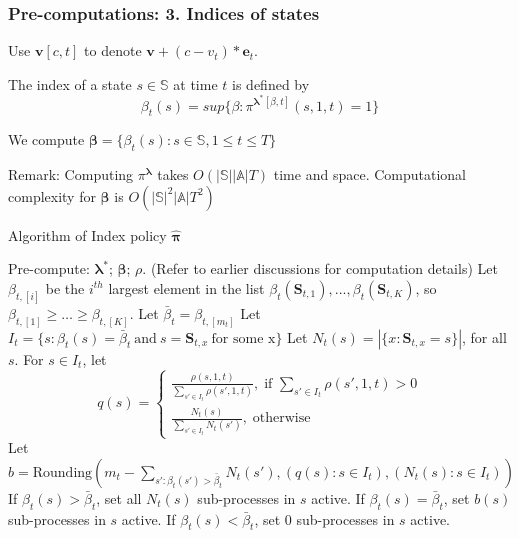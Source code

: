 \documentclass{beamer}
\newcommand{\betav}{\pmb{\beta}}
\newcommand{\lambdav}{\pmb{\lambda}}
\newcommand{\allp}{\pmb{\pi}}
\newcommand{\allstater}{\mathbf{S}}
\newcommand{\substates}{\mathbb{S}}
\newcommand{\substate}{s}
\newcommand{\subactions}{\mathbb{A}}
\begin{document}
\begin{frame}
\frametitle{Pre-computations: 3. Indices of states}
Use $\mathbf{v}[c,t]$ to denote $\mathbf{v}+(c-v_t)*\mathbf{e}_t$.

\vspace{0.5cm}
The index of a state $\substate\in\substates$ at time $t$ is defined by
\begin{equation}
\beta_t(s) = sup\{\beta: \pi^{\lambdav^*[\beta,t]}(s,1,t)=1\}
\end{equation}

\vspace{0.5cm}
We compute $\betav = \{\beta_t(s):s\in\substates,1\leq t\leq T\}$


\vspace{0.5cm}
Remark: Computing $\pi^{\lambdav}$ takes $O(|\substates||\subactions|T)$ time and space. Computational complexity for $\betav$ is $O(|\substates|^2|\subactions|T^2)$
\end{frame}

\begin{frame}{Algorithm of Index policy $\hat{\allp}$}
\begin{algorithm}[H]
\footnotesize
\begin{algorithmic}
\STATE Pre-compute: $\lambdav^*$; $\betav$; $\rho$. (Refer to earlier discussions for computation details) 
    \STATE Let $\beta_{t,[i]}$ be the $i^{th}$ largest element in the list $\beta_t(\allstater_{t,1}),...,\beta_t(\allstater_{t,K})$, so $\beta_{t,[1]}\geq\ldots\geq \beta_{t,[K]}$. 
    \STATE Let $\bar{\beta}_t = \beta_{t,[m_t]}$
    \STATE Let $I_t=\{\substate : \beta_t(s)=\bar{\beta}_t\ \text{and}\ s=\allstater_{t,x}\ \text{for some x}\}$
    \STATE Let $N_t(s) = |\{x:\allstater_{t,x}=s\}|$, for all $\substate$.
    \STATE For $\substate\in I_t$, let 
    $$
    q(s) = 
    \begin{cases}
	\frac{\rho(s,1,t)}{\sum_{s'\in I_t}\rho(s',1,t)}, \; \text{if } \sum_{s'\in I_t}\rho(s',1,t)>0\\
	\frac{N_t(s)}{\sum_{s'\in I_t} N_t(s')}, \; \text{otherwise}
    \end{cases}
    $$
    Let $b = \mathrm{Rounding}(m_t-\sum_{s':\beta_t(s')>\bar{\beta}_t}N_t(s'),
    (q(s):s\in I_t),(N_t(s):s\in I_t))$
    \FOR{all $\substate$}
    \STATE If $\beta_t(s)>\bar{\beta}_t$, set all $N_t(s)$ sub-processes in $s$ active.
    \STATE If $\beta_t(s)= \bar{\beta}_t$, set $b(s)$ sub-processes in $s$ active.
    \STATE If $\beta_t(s)< \bar{\beta}_t$, set 0 sub-processes in $s$ active.
    \ENDFOR
  \ENDFOR
\end{algorithmic}
\end{algorithm}

\end{frame}
\end{document}

